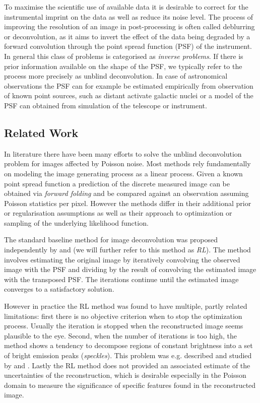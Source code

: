 \documentclass[twocolumn]{aastex631}
\begin{document}
    To maximise the scientific use of available data it is desirable to correct for the instrumental imprint on the data as well as reduce its noise level. The process of improving the resolution of an image in post-processing is often called deblurring or deconvolution, as it aims to invert the effect of the data being degraded by a forward convolution through the point spread function (PSF) of the instrument. In general this class of problems is categorised as \textit{inverse problems}. If there is prior information available on the shape of the PSF, we typically refer to the process more precisely as unblind deconvolution. In case of astronomical observations the PSF can for example be estimated empirically from observation of known point sources, such as distant activate galactic nuclei or a model of the PSF can obtained from simulation of the telescope or instrument.

    \newpage
    \subsection{Related Work}
    In literature there have been many efforts to solve the unblind deconvolution problem for images affected by Poisson noise. Most methods rely fundamentally on modeling the image generating process as a linear process. Given a known point spread function a prediction of the discrete measured image can be obtained via \textit{forward folding} and be compared against an observation assuming Poisson statistics per pixel. However the methods differ in their additional prior or regularisation assumptions as well as their approach to optimization or sampling of the underlying likelihood function.
    
    The standard baseline method for image deconvolution was proposed independently by \cite{Richardson1972} and \cite{Lucy1974} (we will further refer to this method as \textit{RL}). The method involves estimating the original image by iteratively convolving the observed image with the PSF and dividing by the result of convolving the estimated image with the transposed PSF. The iterations continue until the estimated image converges to a satisfactory solution. 

    However in practice the RL method was found to have multiple, partly related limitations: first there is no objective criterion when to stop the optimization process. Usually the iteration is stopped when the reconstructed image seems plausible to the eye. Second, when the number of iterations is too high, the method shows a tendency to decompose regions of constant brightness into a set of bright emission peaks (\textit{speckles}). This problem was e.g. described and studied by \cite{Reeves1995} and \cite{Fish1995}. Lastly the RL method does not provided an associated estimate of the uncertainties of the reconstruction, which is desirable especially in the Poisson domain to measure the significance of specific features found in the reconstructed image.
    
\end{document}
